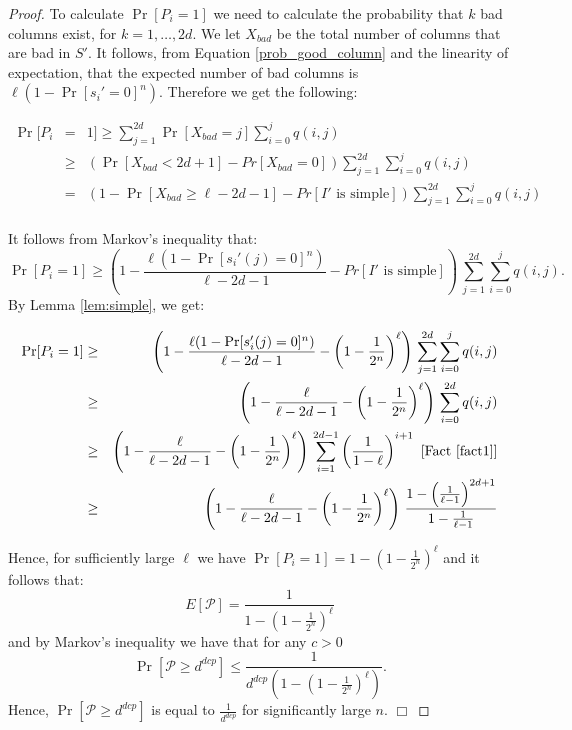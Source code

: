 \begin{proof}
To calculate $\Pr[P_i = 1]$ we need to calculate the probability that $k$ bad columns exist, for $k = 1, \ldots, 2d$. We let $X_{bad}$ be the total number of columns that are bad in $S'$. It follows, from Equation \ref{prob_good_column} and the linearity of expectation, that the expected number of bad columns is $\ell(1 - \Pr[s_i' =0]^n)$.  Therefore we get the following:
  
\begin{eqnarray*}
\Pr[P_i & = & 1] 		 \geq  \sum_{j = 1}^{2d} \Pr[X_{bad} = j]\sum_{i = 0}^j q(i,j) \\
						& \geq &  \left( \Pr[X_{bad} < 2d +1] - Pr[X_{bad} = 0] \right) \sum_{j = 1}^{2d} \sum_{i = 0}^j q(i,j) \\
					 	& = & \left( 1 - \Pr[X_{bad} \geq \ell - 2d - 1] - Pr[I' \mbox{  is simple}] \right) \sum_{j = 1}^{2d} \sum_{i = 0}^j q(i,j) \\
\end{eqnarray*}

\noindent It follows from Markov's inequality that: $$\Pr[P_i  = 1] \geq  \left( 1 -\frac{\ell (1 - \Pr[s_i'(j) = 0]^n)}{\ell - 2d - 1} -  Pr[I' \mbox{  is simple}] \right) \, \sum_{j = 1}^{2d} \sum_{i = 0}^j q(i,j).$$  By Lemma \ref{lem:simple}, we get:

\begin{eqnarray*}
\Pr[P_i  = 1]	& \geq &  \left( 1 -\frac{\ell (1 - \Pr[s_i'(j) = 0]^n)}{\ell - 2d - 1} - \left( 1 - \frac{1}{2^n}\right)^{\ell} \right) \, \sum_{j = 1}^{2d} \sum_{i = 0}^j q(i,j)  \\
					 	& \geq & \left( 1 -\frac{\ell}{\ell - 2d - 1} - \left( 1 - \frac{1}{2^n}\right)^{\ell} \right)\, \sum_{i = 0}^{2d} q(i,j) \\
					 	& \geq & \left( 1 -\frac{\ell}{\ell - 2d - 1} - \left( 1 - \frac{1}{2^n}\right)^{\ell} \right) \, \sum_{i = 1}^{2d - 1} \left( \frac{1}{1 - \ell} \right)^{i + 1}  \, \, \mbox{[Fact \ref{fact1}]} \\
					 	& \geq & \left( 1 -\frac{\ell}{\ell - 2d - 1} - \left( 1 - \frac{1}{2^n}\right)^{\ell} \right) \, \frac{1 - \left(\frac{1}{\ell -1 } \right)^{2d + 1}}{1 - \frac{1}{\ell - 1}}
\end{eqnarray*}

\noindent Hence, for sufficiently large $\ell$ we have $\Pr[P_i = 1] = 1 - \left( 1 - \frac{1}{2^n}\right)^{\ell}$ and it follows that: $$E[\mathcal{P}] = \frac{1}{1 - \left( 1 - \frac{1}{2^n}\right)^{\ell}}$$ and by Markov's inequality we have that for any $c > 0$ $$\Pr[\mathcal{P} \geq d^{dcp}] \leq \frac{1}{d^{dcp} \left(1 - \left( 1 - \frac{1}{2^n}\right)^{\ell}\right)}.$$  Hence, $\Pr[\mathcal{P} \geq d^{dcp}]$ is equal to $ \frac{1}{d^{dcp}}$ for significantly large $n$. \hfill $\Box$ \end{proof}


